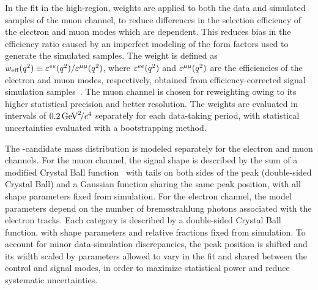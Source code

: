 In the fit in the high-\qsq region,  weights are applied to both the data and simulated samples of the muon channel,
to reduce differences in the selection efficiency of the electron and muon modes which are \qsq dependent.
This reduces bias in the efficiency ratio caused by an imperfect modeling of
the form factors used to generate the simulated samples. The weight is defined as $w_{\mathrm{eff}}(q^2) \equiv \varepsilon^{ee}({q^2}) / \varepsilon^{\mu\mu}({q^2})$, where $\varepsilon^{ee}({q^2})$ and
$\varepsilon^{\mu\mu}({q^2})$ are the efficiencies of the electron and muon modes, respectively, obtained from efficiency-corrected signal simulation
samples~\cite{LHCb-PAPER-2024-056}. The muon channel is chosen for reweighting owing to its higher statistical precision and better \qsq resolution. The weights
are evaluated in \qsq intervals of $0.2\text{\,Ge\kern -0.1em V}^2\!/c^4$ separately for each data-taking period, with statistical uncertainties evaluated with a bootstrapping
method.

The \Bz-candidate mass distribution is modeled separately for the electron and muon channels. For the muon channel, the signal shape is described by the sum
of a modified Crystal Ball function~\cite{Skwarnicki:1986xj} with tails on both sides of the peak (double-sided Crystal Ball) and a Gaussian function sharing the same peak position, with all shape parameters fixed from simulation. For the electron channel, the
model parameters depend on the number of bremsstrahlung photons associated with the electron tracks. Each category is described by a double-sided Crystal Ball function, with shape parameters and relative fractions fixed from simulation. To account for minor data-simulation discrepancies, the peak position is shifted and its width scaled by parameters allowed to vary in the fit and shared between the control and signal modes, in order to maximize statistical power and reduce systematic uncertainties.

